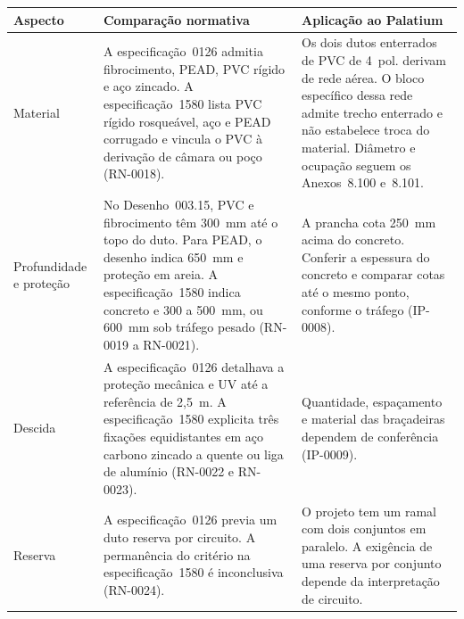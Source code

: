 \par\noindent
\begin{minipage}{\linewidth}
\centering
{}\label{qua:dutos-palatium}
{\small\setlength{\tabcolsep}{4pt}\renewcommand{\arraystretch}{1.15}
\begin{tabular}{|>{\raggedright\arraybackslash}p{.17\linewidth}|>{\raggedright\arraybackslash}p{.38\linewidth}|>{\raggedright\arraybackslash}p{.37\linewidth}|}\hline
\textbf{Aspecto} & \textbf{Comparação normativa} & \textbf{Aplicação ao Palatium} \\\hline
Material & A especificação~0126 admitia fibrocimento, PEAD, PVC rígido e aço zincado. A especificação~1580 lista PVC rígido rosqueável, aço e PEAD corrugado e vincula o PVC à derivação de câmara ou poço (RN-0018). & Os dois dutos enterrados de PVC de 4~pol. derivam de rede aérea. O bloco específico dessa rede admite trecho enterrado e não estabelece troca do material. Diâmetro e ocupação seguem os Anexos~8.100 e~8.101. \\\hline
Profundidade e proteção & No Desenho~003.15, PVC e fibrocimento têm 300~mm até o topo do duto. Para PEAD, o desenho indica 650~mm e proteção em areia. A especificação~1580 indica concreto e 300 a 500~mm, ou 600~mm sob tráfego pesado (RN-0019 a RN-0021). & A prancha cota 250~mm acima do concreto. Conferir a espessura do concreto e comparar cotas até o mesmo ponto, conforme o tráfego (IP-0008). \\\hline
Descida & A especificação~0126 detalhava a proteção mecânica e UV até a referência de 2,5~m. A especificação~1580 explicita três fixações equidistantes em aço carbono zincado a quente ou liga de alumínio (RN-0022 e RN-0023). & Quantidade, espaçamento e material das braçadeiras dependem de conferência (IP-0009). \\\hline
Reserva & A especificação~0126 previa um duto reserva por circuito. A permanência do critério na especificação~1580 é inconclusiva (RN-0024). & O projeto tem um ramal com dois conjuntos em paralelo. A exigência de uma reserva por conjunto depende da interpretação de circuito. \\\hline
\end{tabular}}
\end{minipage}\par

